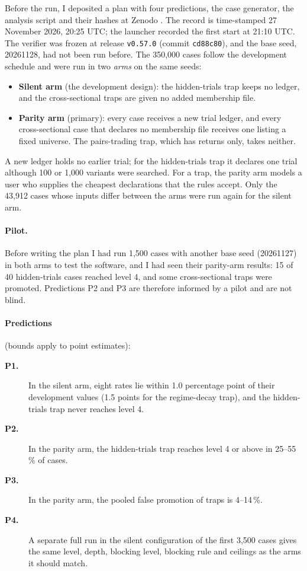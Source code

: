 \documentclass[11pt]{article}
\newcommand{\term}[1]{\item[\textbf{#1}]}
\begin{document}
Before the run, I deposited a plan with four predictions, the case generator, the analysis script and their hashes at
Zenodo \citep{shcherbyna2026prereg}. The record is time-stamped 27 November 2026, 20:25 UTC; the launcher recorded the
first start at 21:10 UTC. The verifier was frozen at release \texttt{v0.57.0} (commit \texttt{cd88c80}), and the base
seed, 20261128, had not been run before. The 350,000 cases follow the development schedule and were run in two
\emph{arms} on the same seeds:
\begin{itemize}
\item \textbf{Silent arm} (the development design): the hidden-trials trap keeps no ledger, and the cross-sectional traps
are given no added membership file.
\item \textbf{Parity arm} (primary): every case receives a new trial ledger, and every cross-sectional case that declares
no membership file receives one listing a fixed universe. The pairs-trading trap, which has returns only, takes neither.
\end{itemize}
A new ledger holds no earlier trial; for the hidden-trials trap it declares one trial although 100 or 1,000 variants were
searched. For a trap, the parity arm models a user who supplies the cheapest declarations that the rules accept. Only the
43,912 cases whose inputs differ between the arms were run again for the silent arm.

\paragraph{Pilot.} Before writing the plan I had run 1,500 cases with another base seed (20261127) in both arms to test
the software, and I had seen their parity-arm results: 15 of 40 hidden-trials cases reached level 4, and some
cross-sectional traps were promoted. Predictions P2 and P3 are therefore informed by a pilot and are not blind.

\paragraph{Predictions} (bounds apply to point estimates):
\begin{description}
\term{P1.} In the silent arm, eight rates lie within 1.0 percentage point of their development values (1.5 points for
the regime-decay trap), and the hidden-trials trap never reaches level 4.
\term{P2.} In the parity arm, the hidden-trials trap reaches level 4 or above in 25--55\,\% of cases.
\term{P3.} In the parity arm, the pooled false promotion of traps is 4--14\,\%.
\term{P4.} A separate full run in the silent configuration of the first 3,500 cases gives the same level, depth,
blocking level, blocking rule and ceilings as the arms it should match.
\end{description}
\end{document}
